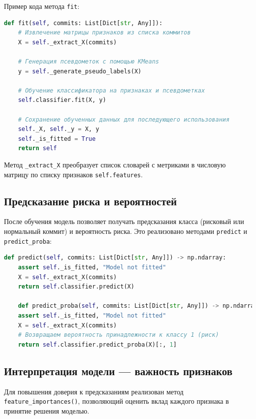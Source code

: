 Пример кода метода \texttt{fit}:

\begin{lstlisting}[language=Python, caption={Обучение модели CommitRiskModel}]
	def fit(self, commits: List[Dict[str, Any]]):
	# Извлечение матрицы признаков из списка коммитов
	X = self._extract_X(commits)
	
	# Генерация псевдометок с помощью KMeans
	y = self._generate_pseudo_labels(X)
	
	# Обучение классификатора на признаках и псевдометках
	self.classifier.fit(X, y)
	
	# Сохранение обученных данных для последующего использования
	self._X, self._y = X, y
	self._is_fitted = True
	return self
\end{lstlisting}

Метод \texttt{\_extract\_X} преобразует список словарей с метриками в числовую матрицу по списку признаков \texttt{self.features}.

\subsection{Предсказание риска и вероятностей}

После обучения модель позволяет получать предсказания класса (рисковый или нормальный коммит) и вероятность риска. Это реализовано методами \texttt{predict} и \texttt{predict\_proba}:

\begin{lstlisting}[language=Python, caption={Предсказание риска коммитов}]
	def predict(self, commits: List[Dict[str, Any]]) -> np.ndarray:
	assert self._is_fitted, "Model not fitted"
	X = self._extract_X(commits)
	return self.classifier.predict(X)
	
	def predict_proba(self, commits: List[Dict[str, Any]]) -> np.ndarray:
	assert self._is_fitted, "Model not fitted"
	X = self._extract_X(commits)
	# Возвращаем вероятность принадлежности к классу 1 (риск)
	return self.classifier.predict_proba(X)[:, 1]
\end{lstlisting}

\subsection{Интерпретация модели — важность признаков}

Для повышения доверия к предсказаниям реализован метод \texttt{feature\_importances()}, позволяющий оценить вклад каждого признака в принятие решения моделью.

